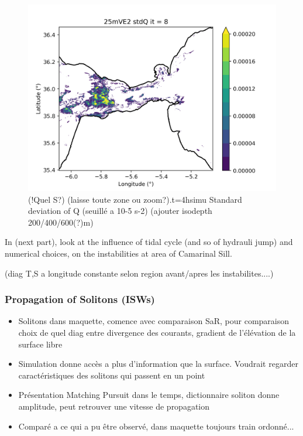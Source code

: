 \begin{figure}[!h]
 \includegraphics[width=\textwidth]{./GBR3D/stdQ_25mIES_it-8.png}
 \caption {(!Quel S?) (laisse toute zone ou zoom?).t=4hsimu Standard deviation of Q (seuillé a 10-5 s-2) (ajouter isodepth 200/400/600(?)m)}
  \label{fig3}
\end{figure}

In (next part), look at the influence of tidal cycle (and so of hydrauli jump) and numerical choices, on the instabilities at area of Camarinal Sill.

(diag T,S a longitude constante selon region avant/apres les instabilites....)




\subsubsection{Propagation of Solitons (ISWs)}

\begin{itemize}
\item Solitons dans maquette, comence avec comparaison SaR, pour comparaison choix de quel diag entre divergence  des courants, gradient de l'élévation de la surface libre
\item Simulation donne accès a plus d'information que la surface. Voudrait regarder caractéristiques des solitons qui passent en un point 
\item Présentation Matching Pursuit dans le temps, dictionnaire soliton donne amplitude, peut retrouver une vitesse de propagation
\item Comparé a ce qui a pu être observé, dans maquette toujours train ordonné...
\end{itemize}


